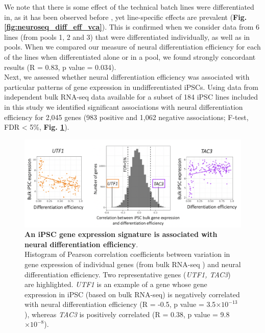\newpage

We note that there is some effect of the technical batch lines were differentiated in, as it has been observed before \cite{kilpinen2017common, schwartzentruber2018molecular}, yet line-specific effects are prevalent (\textbf{Fig. \ref{fig:neuroseq_diff_eff_vca}}).
This is confirmed when we consider data from 6 lines (from pools 1, 2 and 3) that were differentiated individually, as well as in pools.
When we compared our measure of neural differentiation efficiency for each of the lines when differentiated alone or in a pool, we found strongly concordant results (R = 0.83, p value = 0.034).\\ 

Next, we assessed whether neural differentiation efficiency was associated with particular patterns of gene expression in undifferentiated iPSCs. 
Using data from independent bulk RNA-seq data available for a subset of 184 iPSC lines included in this study \cite{kilpinen2017common, bonder2019systematic} we identified significant associations with neural differentiation efficiency for 2,045 genes (983 positive and 1,062 negative associations; F-test, FDR < 5\%, \textbf{Fig. \ref{fig:neuroseq_ips_expression_signature}}). 

\begin{figure}[h]
\centering
\includegraphics[width=16cm]{Chapter5/Fig/neuroseq_ips_bulk_expr_correlations.png}
\caption[iPS expression signature of neural differentiation efficiency]{\textbf{An iPSC gene expression signature is associated with neural differentiation efficiency}.\\
Histogram of Pearson correlation coefficients between variation in gene expression of individual genes (from bulk RNA-seq \cite{bonder2019systematic}) and neural differentiation efficiency. 
Two representative genes (\textit{UTF1, TAC3}) are highlighted. 
\textit{UTF1} is an example of a gene whose gene expression in iPSC (based on bulk RNA-seq) is negatively correlated with neural differentiation efficiency (R = -0.5, p value = 3.5$ \times 10^{-13}$ ), whereas \textit{TAC3} is positively correlated (R = 0.38, p value = 9.8$ \times 10^{-8}$).}
\label{fig:neuroseq_ips_expression_signature}
\end{figure}

